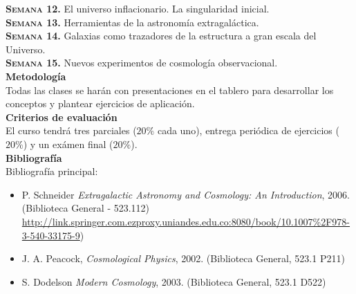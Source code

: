 \documentclass[letterpaper,10pt,onecolumn]{article}
\begin{document}
\noindent\textbf{\textsc{Semana 12.}}  
El universo inflacionario. La singularidad inicial.
\\[-0.3cm]  

\noindent\textbf{\textsc{Semana 13.}} 
Herramientas de la astronom\'ia extragal\'actica.
\\[-0.3cm]  

\noindent\textbf{\textsc{Semana 14.}} 
Galaxias como trazadores de la estructura a gran escala del Universo. 
\\[-0.3cm] 

\noindent\textbf{\textsc{Semana 15.}} 
Nuevos experimentos de cosmolog\'ia observacional.
\\[-0.1cm]  


\noindent\textbf{\large {} \quad
  Metodolog\'ia}\\[-0.2cm] 


\noindent\normalsize Todas las clases se har\'an con presentaciones en
el tablero para desarrollar los conceptos y plantear ejercicios de
aplicaci\'on.\\[0.1cm]

\noindent\textbf{\large {} \quad Criterios de
  evaluaci\'on}\\[-0.2cm] 

El curso tendr\'a tres parciales ($20 \%$ cada uno), entrega
peri\'odica de ejercicios ($20\%$) y un ex\'amen final ($20\%$). \\[0.1cm]


\noindent\textbf{\large {} \quad
  Bibliograf\'ia}\\[-0.2cm] 


\noindent\normalsize Bibliograf\'ia principal:

\begin{itemize}
\item P. Schneider \textit{Extragalactic Astronomy and
  Cosmology: An Introduction},
  2006. (Biblioteca General - 523.112) \url{http://link.springer.com.ezproxy.uniandes.edu.co:8080/book/10.1007%2F978-3-540-33175-9})\\[-0.6cm]
\item J. A. Peacock, \textit{Cosmological Physics}, 2002. (Biblioteca
  General,  523.1 P211)\\[-0.6cm]
\item S. Dodelson \textit{Modern Cosmology}, 2003. (Biblioteca
  General, 523.1 D522)\\[-0.2cm]
\end{itemize} 
\end{document}
